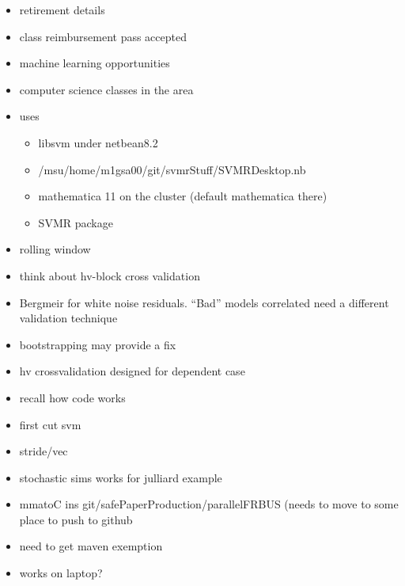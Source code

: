 \documentclass[hyperref]{labbook}
\begin{document}



  \begin{itemize}
  \item retirement details
  \item class reimbursement pass accepted
  \item machine learning opportunities
  \item computer science classes in the area
  \end{itemize}

  \begin{itemize}
  \item uses 
    \begin{itemize}
    \item libsvm under netbean8.2 
    \item /msu/home/m1gsa00/git/svmrStuff/SVMRDesktop.nb 
    \item mathematica 11 on the cluster (default mathematica there)
    \item SVMR package
    \end{itemize}
  \item rolling window
  \item think about hv-block cross validation
  \item Bergmeir for white noise residuals.  ``Bad'' models correlated need a different  validation technique
  \item bootstrapping may provide a fix 
  \item hv crossvalidation designed for dependent case
  \end{itemize}


\begin{itemize}
\item recall how code works
\item first cut svm
\end{itemize}


\begin{itemize}
\item stride/vec
\item stochastic sims  works for julliard example
\item mmatoC ins git/safePaperProduction/parallelFRBUS  (needs to move to some place to push to github
\item need to get maven exemption
\item works on laptop?
\end{itemize}
\end{document}
